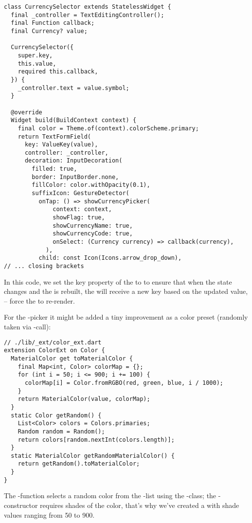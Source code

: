 \begin{lstlisting}
class CurrencySelector extends StatelessWidget {
  final _controller = TextEditingController();
  final Function callback;
  final Currency? value;

  CurrencySelector({
    super.key,
    this.value,
    required this.callback,
  }) {
    _controller.text = value.symbol;
  }

  @override
  Widget build(BuildContext context) {
    final color = Theme.of(context).colorScheme.primary;
    return TextFormField(
      key: ValueKey(value),
      controller: _controller,
      decoration: InputDecoration(
        filled: true,
        border: InputBorder.none,
        fillColor: color.withOpacity(0.1),
        suffixIcon: GestureDetector(
          onTap: () => showCurrencyPicker(
              context: context,
              showFlag: true,
              showCurrencyName: true,
              showCurrencyCode: true,
              onSelect: (Currency currency) => callback(currency),
            ),
          child: const Icon(Icons.arrow_drop_down),
// ... closing brackets
\end{lstlisting}

\noindent In this code, we set the key property of the  to  to ensure that when the 
state changes and the  is rebuilt, the  will receive a new key based on the updated 
value, -- force the  to re-render.

For the -picker it might be added a tiny improvement as a color preset (randomly taken 
via -call):

\begin{lstlisting}
// ./lib/_ext/color_ext.dart
extension ColorExt on Color {
  MaterialColor get toMaterialColor {
    final Map<int, Color> colorMap = {};
    for (int i = 50; i <= 900; i += 100) {
      colorMap[i] = Color.fromRGBO(red, green, blue, i / 1000);
    }
    return MaterialColor(value, colorMap);
  }
  static Color getRandom() {
    List<Color> colors = Colors.primaries;
    Random random = Random();
    return colors[random.nextInt(colors.length)];
  }
  static MaterialColor getRandomMaterialColor() {
    return getRandom().toMaterialColor;
  }
}
\end{lstlisting}

\noindent The -function selects a random color from the -list using the 
-class; the -constructor requires shades of the color, that's why we've created a  
with shade values ranging from 50 to 900.

